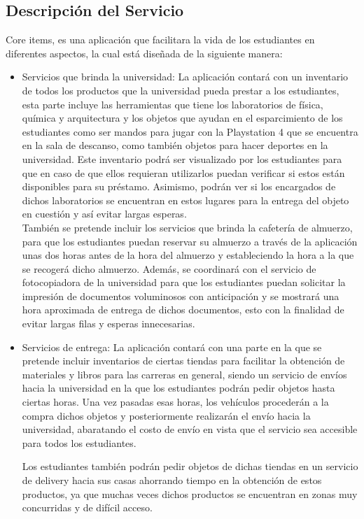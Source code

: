 \documentclass[11pt]{article}
\begin{document}
    \subsection{Descripción del Servicio} 
    
    Core items, es una aplicación que facilitara la vida de los estudiantes en diferentes aspectos, la cual está diseñada de la siguiente manera:
    \begin{itemize}
        \item Servicios que brinda la universidad: La aplicación contará con un inventario de todos los productos que la universidad pueda prestar a los estudiantes, esta parte incluye las herramientas que tiene los laboratorios de física, química y arquitectura y los objetos que ayudan en el esparcimiento de los estudiantes como ser mandos para jugar con la Playstation 4 que se encuentra en la sala de descanso, como también objetos para hacer deportes en la universidad. Este inventario podrá ser visualizado por los estudiantes para que en caso de que ellos requieran utilizarlos puedan verificar si estos están disponibles para su préstamo. Asimismo, podrán ver si los encargados de dichos laboratorios se encuentran en estos lugares para la entrega del objeto en cuestión y así evitar largas esperas. \\
        

        También se pretende incluir los servicios que brinda la  cafetería de almuerzo, para que los estudiantes puedan reservar su almuerzo a través de la aplicación unas dos horas antes de la hora del almuerzo y estableciendo la hora a la que se recogerá dicho almuerzo. Además, se coordinará con el servicio de fotocopiadora de la universidad para que los estudiantes puedan solicitar la impresión de documentos voluminosos con anticipación y se mostrará una hora aproximada de entrega de dichos documentos, esto con la finalidad de evitar largas filas y esperas innecesarias.
        
        \newpage
        \item Servicios de entrega: La aplicación contará con una parte en la que se pretende incluir inventarios de ciertas tiendas para facilitar la obtención de materiales y libros para las carreras en general, siendo un servicio de envíos hacia la universidad en la que los estudiantes podrán pedir objetos hasta ciertas horas. Una vez pasadas esas horas, los vehículos procederán a la compra dichos objetos y posteriormente realizarán el envío hacia la universidad, abaratando el costo de envío en vista que el servicio sea accesible para todos los estudiantes.
        
        Los estudiantes  también podrán pedir objetos de dichas tiendas en un servicio de delivery hacia sus casas ahorrando tiempo en la obtención de estos productos, ya que muchas veces dichos productos se encuentran en zonas muy concurridas y de difícil acceso.

    \end{itemize}
    
\end{document}
